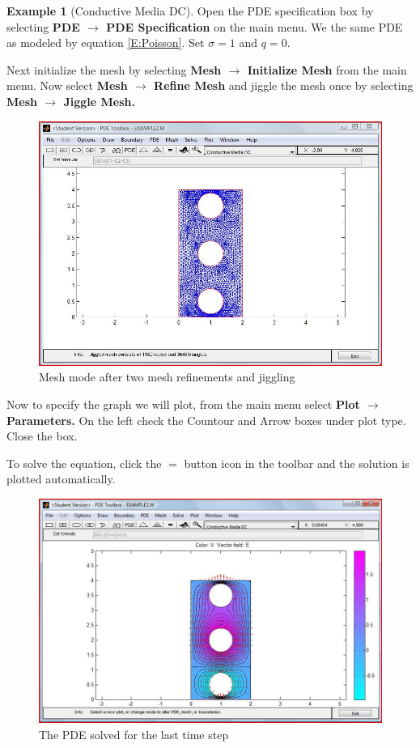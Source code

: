 \documentclass{amsart}
\theoremstyle{definition}
\newtheorem{example}{Example}
\begin{document}
\begin{example}[Conductive Media DC]
Open the PDE specification box by selecting \textbf{PDE $\to$ PDE Specification} on the main menu. We the same PDE as modeled by equation \eqref{E:Poisson}. Set $\sigma = 1$ and $q = 0$. 

Next initialize the mesh by selecting \textbf{Mesh $\to$ Initialize Mesh} from the main menu. Now select \textbf{Mesh $\to$ Refine Mesh} and jiggle the mesh once by selecting \textbf{Mesh $\to$ Jiggle Mesh.}

\begin{figure}[ht]
   \includegraphics[height = 3 in]{MeshModeExample2}
   \caption{Mesh mode after two mesh refinements and jiggling}
\end{figure}

\newpage

Now to specify the graph we will plot, from the main menu select \textbf{Plot $\to$ Parameters.} On the left check the Countour and Arrow boxes under plot type. Close the box.

To solve the equation, click the $=$ button icon in the toolbar and the solution is plotted automatically.

\begin{figure}[ht]
   \includegraphics[height = 3 in]{Example2FinalGraph}
   \caption{The PDE solved for the last time step}
\end{figure}

\end{example}
\end{document}
